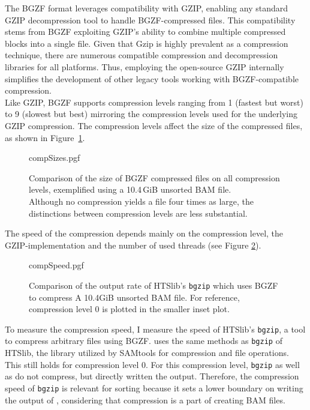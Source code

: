 The BGZF format leverages compatibility with GZIP, enabling any standard GZIP decompression tool to handle BGZF-compressed files. This compatibility stems from BGZF exploiting GZIP's ability to combine multiple compressed blocks into a single file. Given that Gzip is highly prevalent as a compression technique, there are numerous compatible compression and decompression libraries for all platforms. Thus, employing the open-source GZIP internally simplifies the development of other legacy tools working with BGZF-compatible compression.  \\

Like GZIP, BGZF supports compression levels ranging from 1 (fastest but worst) to 9 (slowest but best) mirroring the compression levels used for the underlying GZIP compression. The compression levels affect the size of the compressed files, as shown in Figure~\ref{fig:compSizes}.
\begin{figure}[t]
        {compSizes.pgf}
    \caption{Comparison of the size of BGZF compressed files on all compression levels, exemplified using a 10.4\,GiB unsorted BAM file. \\
    Although no compression yields a file four times as large, the distinctions between compression levels are less substantial.}
    \label{fig:compSizes}
\end{figure}
The speed of the compression depends mainly on the compression level, the GZIP-implementation and the number of used threads (see Figure \ref{fig:compSpeed}).  
\begin{figure}
        {compSpeed.pgf}
    \caption{Comparison of the output rate of HTSlib's \texttt{bgzip} which uses BGZF to compress A 10.4GiB unsorted BAM file. For reference, compression level 0 is plotted in the smaller inset plot.}
    \label{fig:compSpeed}
\end{figure}
To measure the compression speed, I measure the speed of HTSlib's \texttt{bgzip}, a tool to compress arbitrary files using BGZF. \sort uses the same methods as \texttt{bgzip} of HTSlib, the library utilized by SAMtools for compression and file operations. This still holds for compression level 0. For this compression level, \texttt{bgzip} as well as \sort do not compress, but directly written the output. Therefore, the compression speed of \texttt{bgzip} is relevant for sorting because it sets a lower boundary on writing the output of \sort, considering that compression is a part of creating BAM files.
